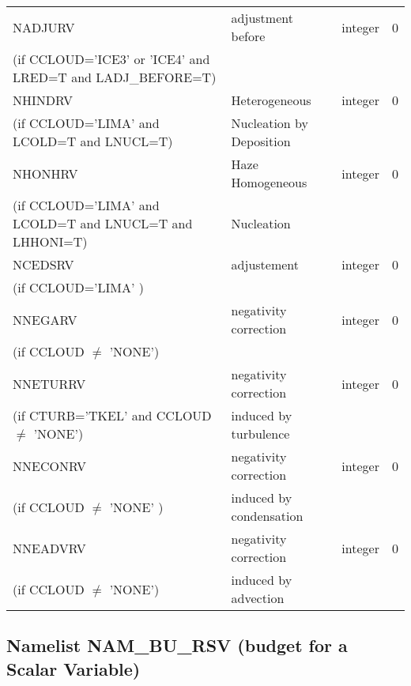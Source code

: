\begin{longtable} {|p{}|p{}|>{\centering}p{}|p{}<{\centering}|}
NADJURV  & adjustment before          & integer  &  0 \index{NADJURV!\innam{NAM\_BU\_RRV}}\\ \nopagebreak
(if CCLOUD='ICE3' or 'ICE4' and LRED=T and LADJ\_BEFORE=T) & &   &  \\\hline
NHINDRV   & Heterogeneous & integer  &  0 \index{NHINDRV!\innam{NAM\_BU\_RRV}}\\ \nopagebreak
(if CCLOUD='LIMA' and LCOLD=T and LNUCL=T) & Nucleation by Deposition  &   &  \\\hline
NHONHRV   &Haze Homogeneous   & integer  &  0 \index{NHONHRV!\innam{NAM\_BU\_RRV}}\\ \nopagebreak
(if CCLOUD='LIMA' and LCOLD=T and LNUCL=T and LHHONI=T) & Nucleation  &   &  \\\hline
NCEDSRV   & adjustement & integer  &  0 \index{NCEDSRV!\innam{NAM\_BU\_RRV}}\\ \nopagebreak
(if CCLOUD='LIMA'  ) & &   &  \\\hline
NNEGARV   & negativity correction & integer  &  0 \index{NNEGARV!\innam{NAM\_BU\_RRV}}\\ \nopagebreak
(if CCLOUD $\neq$ 'NONE') & &   &  \\\hline
NNETURRV   & negativity correction  & integer  &  0 \index{NNETURRV!\innam{NAM\_BU\_RRV}}\\ \nopagebreak
(if CTURB='TKEL' and CCLOUD $\neq$ 'NONE') & induced by turbulence&   &  \\\hline
 NNECONRV  & negativity correction & integer  &  0 \index{NNECONRV!\innam{NAM\_BU\_RRV}}\\ \nopagebreak
(if CCLOUD $\neq$ 'NONE' ) & induced by condensation&   &  \\\hline
NNEADVRV&negativity correction   & integer  &  0 \index{NNEADVRV!\innam{NAM\_BU\_RRV}}\\ \nopagebreak
(if CCLOUD $\neq$ 'NONE') & induced by advection&   &  \\\hline
\end{longtable}

\subsection{Namelist NAM\_BU\_RSV (budget for a Scalar Variable)}


